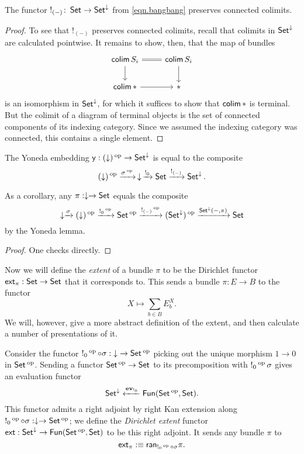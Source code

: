 \begin{lem}\label{lem:bang.preserves.connected.colimits}
  The functor $!_{(-)}\colon\Set\to\Set^{\down}$ from \eqref{eqn.bangbang} preserves connected colimits.
\end{lem}
\begin{proof}
  To see that $!_{(-)}$ preserves connected colimits, recall that colimits in $\Set^{\down}$ are calculated pointwise. It remains to show, then, that the map of bundles
  \[
    \begin{tikzcd}
    \colim S_i \arrow[r, equals] \arrow[d] & \colim S_i \arrow[d] \\
    \colim \ast \arrow[r] & \ast 
    \end{tikzcd}
  \]
  is an isomorphism in $\Set^{\down}$, for which it suffices to show that
  $\colim \ast$ is terminal. But the colimit of a diagram of terminal objects is the set
  of connected components of its indexing category. Since we assumed the
  indexing category was connected, this contains a single element.
\end{proof}

\begin{lem}\label{lem:set.bundle.yoneda}
The Yoneda embedding $\yo : (\downarrow)\op \to \Set^{\downarrow}$ is equal to the
composite $$(\downarrow)\op \xto{\sigma\op} \,\downarrow\, \xto{!_{0}} \Set
\xto{!_{(-)}} \Set^{\downarrow}.$$

As a corollary, any $\pi : \downarrow \to \Set$ equals the composite
$$\downarrow \xto{\sigma} (\downarrow)\op \xto{!_0\op} \Set\op \xto{!_{(-)}\op}
(\Set^{\downarrow})\op \xto{\Set^{\downarrow}(-, \pi)} \Set$$
by the Yoneda lemma.
\end{lem}
\begin{proof}
One checks directly.
\end{proof}

Now we will define the \emph{extent} of a bundle $\pi$ to be the Dirichlet functor $\ext_\pi: \Set\to\Set$ that it
corresponds to. This sends a bundle
$\pi : E \to B$ to the functor
$$X \mapsto \sum_{b \in B} E_b^X.$$
We will, however, give a more abstract definition of the extent, and then
calculate a number of presentations of it.

\begin{defn}\label{def.extent}
  Consider the functor $!_0\op \circ \sigma : \down \to \Set\op$ picking out the
  unique morphism $1\to 0$ in $\Set\op$. Sending a functor $\Set\op\to\Set$ to
  its precomposition with $!_0\op \sigma$ gives an evaluation functor
  $$\Set^{\down} \xleftarrow{\ev_{!_0}} \Fun(\Set\op, \Set).$$
  This functor admits a right adjoint by right Kan extension along $!_0\op \circ
  \sigma : \downarrow \to \Set\op$; we define the
  \emph{Dirichlet extent} functor $\ext : \Set^{\down} \to \Fun(\Set\op,
  \Set)$ to be this right adjoint. It sends any bundle $\pi$ to
  $$\ext_{\pi} :\equiv \term{ran}_{!_0\op \circ \sigma} \pi.$$
\end{defn}


